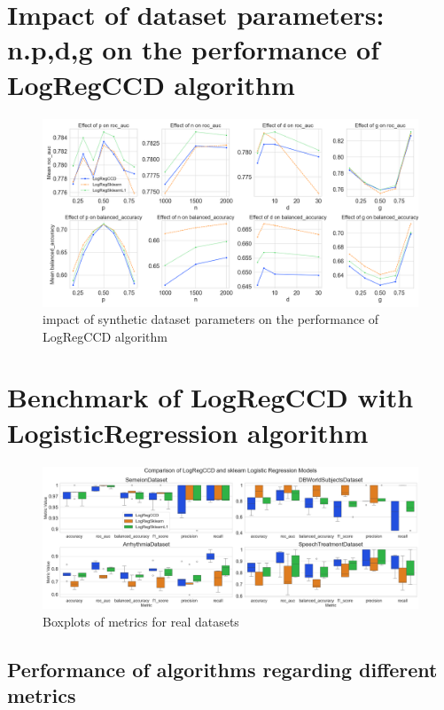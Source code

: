 \documentclass[12pt]{article}
\begin{document}
\section{Impact of dataset parameters: n.p,d,g on the performance of LogRegCCD algorithm}


\begin{figure}[h]
    \centering
  \includegraphics[width=\textwidth]{../results/parameter_facet_grid.png}
    \caption{impact of synthetic dataset parameters on the performance of LogRegCCD algorithm}
    \label{fig:synthetic-dataset-parameters}
  \end{figure}

\section{Benchmark of LogRegCCD with LogisticRegression algorithm}


\begin{figure}[h]
    \centering
  \includegraphics[width=\textwidth]{../results/real_data_boxplots.png}
    \caption{Boxplots of metrics for real datasets}
    \label{fig:real-data-boxplots}
  \end{figure}


\subsection{Performance of algorithms regarding different metrics}
\end{document}
